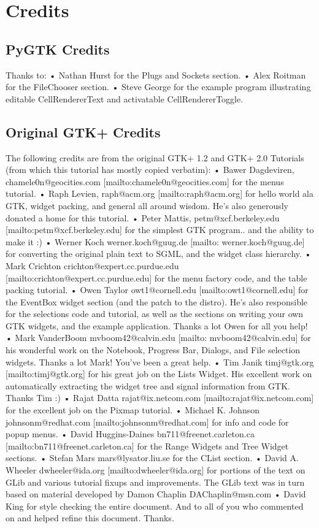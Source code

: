 \chapter{Credits}
\section{PyGTK Credits}
Thanks to:
• Nathan Hurst for the Plugs and Sockets section.
• Alex Roitman for the FileChooser section.
• Steve George for the example program illustrating editable CellRendererText and activatable
CellRendererToggle.
\section{Original GTK+ Credits}
The following credits are from the original GTK+ 1.2 and GTK+ 2.0 Tutorials (from which this tutorial has mostly
copied verbatim):
• Bawer Dagdeviren, chamele0n@geocities.com [mailto:chamele0n@geocities.com] for the menus tutorial.
• Raph Levien, raph@acm.org [mailto:raph@acm.org] for hello world ala GTK, widget packing, and general all
around wisdom. He’s also generously donated a home for this tutorial.
• Peter Mattis, petm@xcf.berkeley.edu [mailto:petm@xcf.berkeley.edu] for the simplest GTK program.. and the
ability to make it :)
• Werner Koch werner.koch@guug.de [mailto: werner.koch@guug.de] for converting the original plain text to
SGML, and the widget class hierarchy.
• Mark Crichton crichton@expert.cc.purdue.edu [mailto:crichton@expert.cc.purdue.edu] for the menu factory code,
and the table packing tutorial.
• Owen Taylor owt1@cornell.edu [mailto:owt1@cornell.edu] for the EventBox widget section (and the patch to the
distro). He’s also responsible for the selections code and tutorial, as well as the sections on writing your own GTK
widgets, and the example application. Thanks a lot Owen for all you help!
• Mark VanderBoom mvboom42@calvin.edu [mailto: mvboom42@calvin.edu] for his wonderful work on the
Notebook, Progress Bar, Dialogs, and File selection widgets. Thanks a lot Mark! You’ve been a great help.
• Tim Janik timj@gtk.org [mailto:timj@gtk.org] for his great job on the Lists Widget. His excellent work on
automatically extracting the widget tree and signal information from GTK. Thanks Tim :)
• Rajat Datta rajat@ix.netcom.com [mailto:rajat@ix.netcom.com] for the excellent job on the Pixmap tutorial.
• Michael K. Johnson johnsonm@redhat.com [mailto:johnsonm@redhat.com] for info and code for popup menus.
• David Huggins-Daines bn711@freenet.carleton.ca [mailto:bn711@freenet.carleton.ca] for the Range Widgets and
Tree Widget sections.
• Stefan Mars mars@lysator.liu.se for the CList section.
• David A. Wheeler dwheeler@ida.org [mailto:dwheeler@ida.org] for portions of the text on GLib and various
tutorial fixups and improvements. The GLib text was in turn based on material developed by Damon Chaplin
DAChaplin@msn.com
• David King for style checking the entire document.
And to all of you who commented on and helped refine this document.
Thanks.

